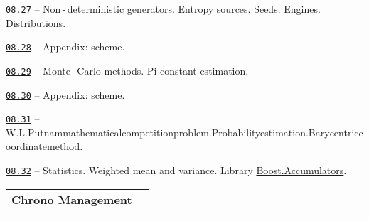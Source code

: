 \documentclass[a4paper,12pt]{article}
\renewenvironment{itemize}
{
    \begin{list}{\labelitemi}
    {
      \setlength{\topsep}{0pt}
      \setlength{\partopsep}{0pt}
      \setlength{\parskip}{0pt}
      \setlength{\itemsep}{0pt}
      \setlength{\parsep}{0pt}
      \setlength{\leftmargin}{14.5pt}
    }
}{\end{list}}
\begin{document}
\medskip\smallskip

\begin{itemize}

    \item \href{https://github.com/i-s-m-mipt/Education/blob/master/projects/examples/source/08.27.cpp}{\texttt{08.27}} -- Non\,-\,deterministic generators. Entropy sources. Seeds. Engines. Distributions.

    \smallskip

    \item \href{https://github.com/i-s-m-mipt/Education/blob/master/projects/examples/source/08.28.pdf}{\texttt{08.28}} -- Appendix: scheme.

    \smallskip

    \item \href{https://github.com/i-s-m-mipt/Education/blob/master/projects/examples/source/08.29.cpp}{\texttt{08.29}} -- Monte\,-\,Carlo methods. Pi constant estimation.

    \smallskip

    \item \href{https://github.com/i-s-m-mipt/Education/blob/master/projects/examples/source/08.30.pdf}{\texttt{08.30}} -- Appendix: scheme.

    \smallskip

    \item \href{https://github.com/i-s-m-mipt/Education/blob/master/projects/examples/source/08.31.cpp}{\texttt{08.31}} -- W.\:L.\:Putnam\:mathematical\:competition\:problem.\:Probability\:estimation.\:Barycentric\:coordinate\:method.

    \smallskip

    \item \href{https://github.com/i-s-m-mipt/Education/blob/master/projects/examples/source/08.32.cpp}{\texttt{08.32}} -- Statistics. Weighted mean and variance. Library \href{https://www.boost.org/doc/libs/1_89_0/doc/html/accumulators.html}{Boost.Accumulators}.

\end{itemize}

\bigskip\medskip

\begin{tabular}{!{\vrule width 1pt}L{4.2cm}!{\vrule width 1pt}L{14.8cm}!{\vrule width 0pt}} 


\textbf{Chrono Management} & \\


\end{tabular}
\end{document}
